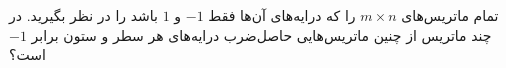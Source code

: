     \p 
تمام ماتریس‌های
$m \times n$
را که درایه‌های آن‌ها فقط
$-1$
و
$1$
باشد را در نظر بگیرید. در چند ماتریس از چنین ماتریس‌هایی حاصل‌ضرب درایه‌های هر سطر و ستون برابر
$-1$
است؟